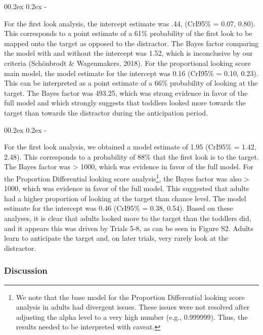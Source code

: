 \documentclass[
  man, donotrepeattitle,floatsintext]{apa6}
\makeatletter
\let\oldsubparagraph\subparagraph
\renewcommand{\subparagraph}{
    \@ifstar
      \xxxSubParagraphStar
      \xxxSubParagraphNoStar
  }
\newcommand{\xxxSubParagraphStar}[1]{\oldsubparagraph*{#1}\mbox{}}
\newcommand{\xxxSubParagraphNoStar}[1]{\oldsubparagraph{#1}\mbox{}}
\renewcommand{\subparagraph}[1]{\@startsection{subparagraph}{5}{1em}%
  {0\baselineskip \@plus 0.2ex \@minus 0.2ex}%
  {-\z@\relax}%
  {\normalfont\normalsize\itshape\hspace{\parindent}{#1}\textit{\addperi}}{\relax}}
\makeatother
\begin{document}
\subparagraph{Toddlers.}\label{toddlers.}

For the first look analysis, the intercept estimate was .44, (CrI95\% = 0.07, 0.80). This corresponds to a point estimate of a 61\% probability of the first look to be mapped onto the target as opposed to the distractor. The Bayes factor comparing the model with and without the intercept was 1.52, which is inconclusive by our criteria (Schönbrodt \& Wagenmakers, 2018). For the proportional looking score main model, the model estimate for the intercept was 0.16 (CrI95\% = 0.10, 0.23). This can be interpreted as a point estimate of a 66\% probability of looking at the target. The Bayes factor was 493.25, which was strong evidence in favor of the full model and which strongly suggests that toddlers looked more towards the target than towards the distractor during the anticipation period.

\subparagraph{Adults.}\label{adults.}

For the first look analysis, we obtained a model estimate of 1.95 (CrI95\% = 1.42, 2.48). This corresponds to a probability of 88\% that the first look is to the target. The Bayes factor was \textgreater{} 1000, which was evidence in favor of the full model. For the Proportion Differential looking score analysis\footnote{We note that the base model for the Proportion Differential looking score analysis in adults had divergent issues. These issues were not resolved after adjusting the alpha level to a very high number (e.g., 0.999999). Thus, the results needed to be interpreted with caveat.}, the Bayes factor was also \textgreater{} 1000, which was evidence in favor of the full model. This suggested that adults had a higher proportion of looking at the target than chance level. The model estimate for the intercept was 0.46 (CrI95\% = 0.38, 0.54). Based on these analyses, it is clear that adults looked more to the target than the toddlers did, and it appears this was driven by Trials 5-8, as can be seen in Figure S2. Adults learn to anticipate the target and, on later trials, very rarely look at the distractor.

\subsubsection{Discussion}\label{discussion}
\end{document}
